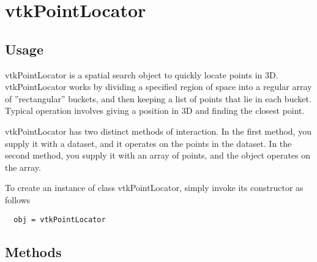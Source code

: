 \section{vtkPointLocator}

\subsection{Usage}

 vtkPointLocator is a spatial search object to quickly locate points in 3D.
 vtkPointLocator works by dividing a specified region of space into a regular
 array of ''rectangular'' buckets, and then keeping a list of points that 
 lie in each bucket. Typical operation involves giving a position in 3D 
 and finding the closest point.

 vtkPointLocator has two distinct methods of interaction. In the first
 method, you supply it with a dataset, and it operates on the points in 
 the dataset. In the second method, you supply it with an array of points,
 and the object operates on the array.

To create an instance of class vtkPointLocator, simply
invoke its constructor as follows
\begin{verbatim}
  obj = vtkPointLocator
\end{verbatim}
\subsection{Methods}

